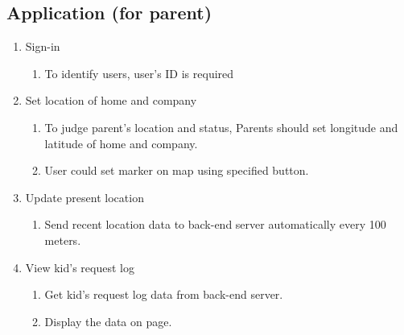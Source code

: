 \documentclass[conference]{IEEEtran}
\begin{document}
\subsection{Application (for parent)}
\begin{enumerate}
    \item Sign-in
    \begin{enumerate}
        \item To identify users, user’s ID is required\\
    \end{enumerate}
    \item Set location of home and company
    \begin{enumerate}
        \item To judge parent’s location and status, Parents should set longitude and latitude of home and company.
        \item User could set marker on map using specified button.\\
    \end{enumerate}
    \item Update present location
    \begin{enumerate}
        \item Send recent location data to back-end server automatically every 100 meters.\\
    \end{enumerate}
    \item View kid’s request log
    \begin{enumerate}
        \item Get kid’s request log data from back-end server.
        \item Display the data on page.\\
    \end{enumerate}
\end{enumerate}
\end{document}
